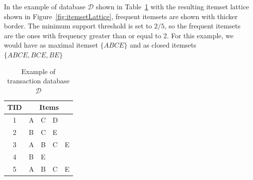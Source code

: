 In the example of database $\mathcal{D}$ shown in Table~\ref{tab:itemsetLattice} with the resulting itemset lattice
shown in Figure~\ref{fig:itemsetLattice}, frequent itemsets are shown with thicker border. The minimum support
threshold is set to $2/5$, so the frequent itemsets are the ones with frequency greater than or equal to 2. For this
example, we would have as maximal itemset $\{ABCE\}$ and as closed itemsets $\{ABCE, BCE, BE\}$

\begin{table}[h!]
  \begin{center}
      \begin{tabular}{ c | l l l l }
      \toprule
      \textbf{TID} & \multicolumn{4}{c}{\textbf{Items}} \\
      \midrule
	1	& A & C & D & \\
	2 	& B & C & E & \\
	3	& A & B & C & E \\
	4 	& B & E &   & \\
	5	& A & B & C & E \\
      \bottomrule
      \end{tabular}
  \caption{Example of transaction database $\mathcal{D}$ \citep{Pasquier99efficientmining}}
  \label{tab:itemsetLattice}
 \end{center}
\end{table}

